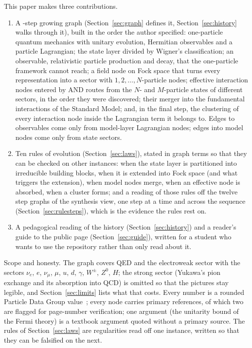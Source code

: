 \documentclass[11pt,a4paper]{article}
\begin{document}
This paper makes three contributions.
\begin{enumerate}
\item A \nSteps-step growing graph (Section~\ref{sec:graph} defines it, Section~\ref{sec:history} walks through it), built in the order the author specified: one-particle quantum mechanics with unitary evolution, Hermitian observables and a particle Lagrangian; the state layer divided by Wigner's classification; an observable, relativistic particle production and decay, that the one-particle framework cannot reach; a field node on Fock space that turns every representation into a sector with $1,2,\dots,N$-particle nodes; effective interaction nodes entered by AND routes from the $N$- and $M$-particle states of different sectors, in the order they were discovered; their merger into the fundamental interactions of the Standard Model; and, in the final step, the clustering of every interaction node inside the Lagrangian term it belongs to. Edges to observables come only from model-layer Lagrangian nodes; edges into model nodes come only from state sectors.
\item Ten rules of evolution (Section~\ref{sec:laws}), stated in graph terms so that they can be checked on other instances: when the state layer is partitioned into irreducible building blocks, when it is extended into Fock space (and what triggers the extension), when model nodes merge, when an effective node is absorbed, when a cluster forms; and a reading of those rules off the twelve step graphs of the synthesis view, one step at a time and across the sequence (Section~\ref{sec:rulesteps}), which is the evidence the rules rest on.
\item A pedagogical reading of the history (Section~\ref{sec:history}) and a reader's guide to the public page (Section~\ref{sec:guide}), written for a student who wants to use the repository rather than only read about it.
\end{enumerate}

Scope and honesty. The graph covers QED and the electroweak sector with the sectors $\nu_e$, $e$, $\nu_\mu$, $\mu$, $u$, $d$, $\gamma$, $W^\pm$, $Z^0$, $H$; the strong sector (Yukawa's pion exchange and its absorption into QCD) is omitted so that the pictures stay legible, and Section~\ref{sec:limits} lists what that costs. Every number is a rounded Particle Data Group value~\cite{PDG2024}; every node carries primary references, of which two are flagged for page-number verification; one argument (the unitarity bound of the Fermi theory) is a textbook argument quoted without a primary source. The rules of Section~\ref{sec:laws} are regularities read off one instance, written so that they can be falsified on the next.
\end{document}

